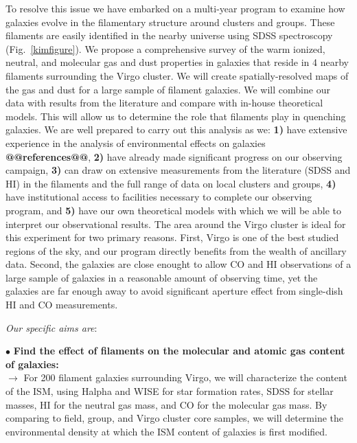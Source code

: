 \documentclass[11pt, preprint]{aastex}
\begin{document}
To resolve this issue we have embarked on a multi-year program to
examine how galaxies evolve in the filamentary structure around
clusters and groups.  These filaments are easily identified in the
nearby universe using SDSS spectroscopy
(Fig.~\ref{kimfigure}).  We propose a
comprehensive survey of the warm ionized, neutral, and
molecular gas and dust properties in galaxies that reside in 4 nearby
filaments surrounding the Virgo cluster.  We will
create spatially-resolved maps of the gas and dust for a large sample
of filament galaxies.  We will
combine our data with results from the literature and compare with in-house
theoretical models.  This will allow us to determine the
role that filaments play in quenching galaxies.  We are well prepared to carry
out this analysis as we: \textbf{1)} have extensive experience in the
analysis of environmental effects on galaxies \textbf{@@references@@},
\textbf{2)} have already made significant progress on our observing
campaign, \textbf{3)} can draw on extensive measurements from the
literature (SDSS and HI) in the filaments and the full range of data
on local clusters and groups, \textbf{4)} have institutional access to
facilities necessary to complete our observing program, and
\textbf{5)} have our own theoretical models with which we will be able
to interpret our observational results.  The area around the Virgo
cluster is ideal for this experiment for two primary reasons.  First,
Virgo is one of the best studied regions of the sky, and our program
directly benefits from the wealth of ancillary data.  Second, the
galaxies are close enought to allow CO and HI observations of a large
sample of galaxies in a reasonable amount of observing time, yet the galaxies are far enough away to avoid significant aperture effect from single-dish HI and CO measurements.

\textit{Our specific aims are}:


\noindent $\bullet$ \textbf{Find the effect of filaments on the molecular and atomic gas content of galaxies:}\\ $\rightarrow$ 
For 200 filament galaxies surrounding Virgo, we will characterize the
content of the ISM, using Halpha and WISE for star formation rates,
SDSS for stellar masses, HI for the neutral gas mass, and CO for the
molecular gas mass. By comparing to field, group, and Virgo cluster
core samples, we will determine the environmental density at which the
ISM content of galaxies is first modified.
%
  
\end{document}
